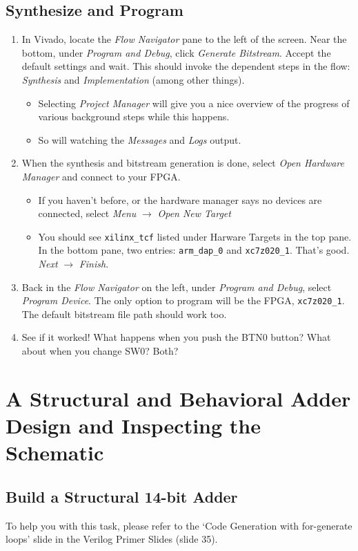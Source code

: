 \documentclass[11pt]{article}
\begin{document}
\subsection{Synthesize and Program}
\begin{enumerate}
  \item In Vivado, locate the \emph{Flow Navigator} pane to the left of the screen. Near the bottom, under \emph{Program and Debug}, click \emph{Generate Bitstream}. Accept the default settings and wait. This should invoke the dependent steps in the flow: \emph{Synthesis} and \emph{Implementation} (among other things).
    \begin{itemize}
      \item Selecting \emph{Project Manager} will give you a nice overview of the progress of various background steps while this happens.
      \item So will watching the \emph{Messages} and \emph{Logs} output.
    \end{itemize}
  \item When the synthesis and bitstream generation is done, select \emph{Open Hardware Manager} and connect to your FPGA.
    \begin{itemize}
      \item If you haven't before, or the hardware manager says no devices are connected, select \emph{Menu} $\rightarrow$ \emph{Open New Target}
      \item You should see \verb|xilinx_tcf| listed under Harware Targets in the top pane. In the bottom pane, two entries: \verb|arm_dap_0| and \verb|xc7z020_1|. That's good. \emph{Next} $\rightarrow$ \emph{Finish}.
    \end{itemize}
  \item Back in the \emph{Flow Navigator} on the left, under \emph{Program and Debug}, select \emph{Program Device}. The only option to program will be the FPGA, \verb|xc7z020_1|. The default bitstream file path should work too.
  \item See if it worked! What happens when you push the BTN0 button? What about when you change SW0? Both?
\end{enumerate}

\section{A Structural and Behavioral Adder Design and Inspecting the Schematic}

\subsection{Build a Structural 14-bit Adder}
To help you with this task, please refer to the `Code Generation with for-generate loops' slide in the Verilog Primer Slides (slide 35).
\end{document}
